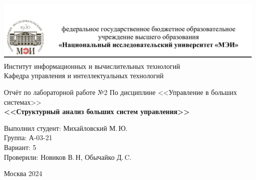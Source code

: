 \begin{titlepage}
	\newpage
	\begin{center}
		\includegraphics[width=\textwidth]{png/tit.png}
		Институт информационных и вычислительных технологий \\
			Кафедра управления и интеллектуальных технологий
		\vspace{1.25cm}
	\end{center}
	
	\vspace{1.2em}
	
	\begin{center}
		\begin{spacing}{1}
			{\Large Отчёт по лабораторной работе №2 \linebreak
			По дисциплине <<Управление в больших системах>> \\}
			\large{\bf<<Структурный анализ больших систем управления>>}
		\end{spacing}
	\end{center}
	
	\vspace{5em}
	

	\vspace{6em}
	
		\noindent Выполнил студент: Михайловский М.\,Ю. \\
		Группа: А-03-21 \\
		Вариант: 5\\
		Проверили: Новиков В.\,Н, Обычайко Д.\,C.
	
	
	\vspace{\fill}
	
	\begin{center}
		Москва 2024
	\end{center}
	
\end{titlepage}